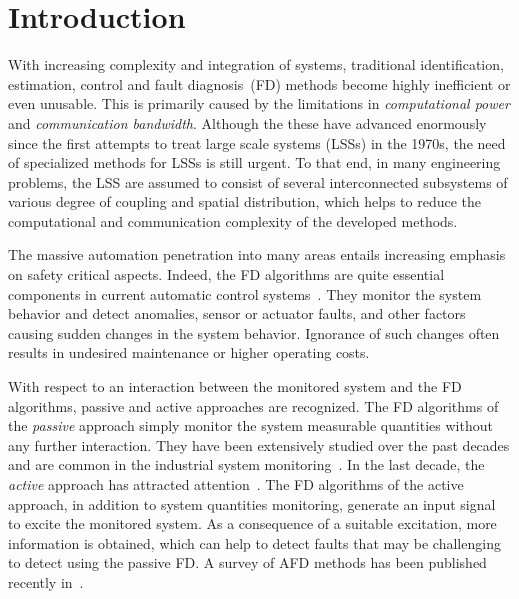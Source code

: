 \documentclass[conference,letterpaper]{IEEEtran}
\begin{document}
\section{Introduction}\label{sec:introduction}
With increasing complexity and integration of systems, traditional identification, estimation, control and fault diagnosis~(FD) methods become highly inefficient or even unusable.
This is primarily caused by the limitations in \emph{computational power} and \emph{communication bandwidth}.
Although the these have advanced enormously since the first attempts to treat large scale systems (LSSs) in the 1970s, the need of specialized methods for LSSs is still urgent.
To that end, in many engineering problems, the LSS are assumed to consist of several interconnected subsystems of various degree of coupling and spatial distribution, which helps to reduce the computational and communication complexity of the developed methods. 

The massive automation penetration into many areas entails increasing emphasis on safety critical aspects. 
Indeed, the FD algorithms are quite essential components in current automatic control systems~\cite{Severson2015:cp:SAFEPROCESS}. 
They monitor the system behavior and detect anomalies, sensor or actuator faults, and other factors causing sudden changes in the system behavior. 
Ignorance of such changes often results in undesired maintenance or higher operating costs.

With respect to an interaction between the monitored system and the FD algorithms, passive and active approaches are recognized. 
The FD algorithms of the \textit{passive} approach simply monitor the system measurable quantities without any further interaction. 
They have been extensively studied over the past decades and are common in the industrial system monitoring~\cite{Simani2003:b,Blanke2016:b}. 
In the last decade, the \textit{active} approach has attracted attention~\cite{Niemann2005:cp:ACC,Raimondo2016:cp:CDC}. 
The FD algorithms of the active approach, in addition to system quantities monitoring, generate an input signal to excite the monitored system. 
As a consequence of a suitable excitation, more information  is obtained, which can help to detect faults that may be challenging to detect using the passive FD\@. A survey of AFD methods has been published recently in~\cite{HeMe:19}.
\end{document}
